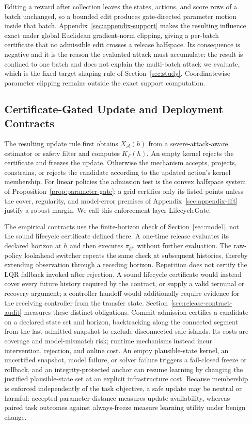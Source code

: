Editing a reward after collection leaves the states, actions, and score rows
of a batch unchanged, so a bounded edit produces gate-directed parameter
motion inside that batch.  Appendix~\ref{sec:appendix-support} makes the
resulting influence exact under global Euclidean gradient-norm clipping,
giving a per-batch certificate that no admissible edit crosses a release
halfspace.  Its consequence is negative and it is the reason the evaluated
attack must accumulate: the result is confined to one batch and does not
explain the multi-batch attack we evaluate, which is the fixed target-shaping
rule of Section~\ref{sec:study}.  Coordinatewise parameter clipping remains
outside the exact support computation.

\subsection{Certificate-Gated Update and Deployment Contracts}
\label{sec:lifecyclegate}

The resulting update rule first obtains $X_{\mathcal A}(h)$ from a
severe-attack-aware estimator or safety filter and computes $K_\Gamma(h)$.  An
empty kernel rejects the certificate and freezes the update.  Otherwise the
mechanism accepts, projects, constrains, or rejects the candidate according to
the updated action's kernel membership.  For linear policies the admission
test is the convex halfspace system of
Proposition~\ref{prop:parameter-gate}; a grid certifies only its listed points
unless the cover, regularity, and model-error premises of
Appendix~\ref{sec:appendix-lift} justify a robust margin.  We call this
enforcement layer LifecycleGate.

The empirical contracts use the finite-horizon check of
Section~\ref{sec:model}, not the sound lifecycle certificate defined there.  A
one-time release evaluates its declared horizon at $h$ and then executes
$\pi_{\theta^+}$ without further evaluation.  The raw-policy lookahead
switcher repeats the same check at subsequent histories, thereby extending
observation through a receding horizon.  Repetition does not certify the LQR
fallback invoked after rejection.  A sound lifecycle certificate would instead cover every
future history required by the contract, or supply a valid terminal or
recovery argument; a controller handoff would additionally require evidence
for the receiving controller from the transfer state.
Section~\ref{sec:release-contract-audit} measures these distinct obligations.
Commit admission certifies a candidate on a declared state set and horizon,
backtracking along the connected segment from the last admitted snapshot to
exclude disconnected safe islands.  Its costs are coverage and model-mismatch
risk; runtime mechanisms instead incur intervention, rejection, and online
cost.  An empty plausible-state kernel, an uncertified snapshot,
model failure, or solver failure triggers a fail-closed freeze or rollback,
and an integrity-protected anchor can resume learning by changing the justified
plausible-state set at an explicit infrastructure cost.  Because membership is
enforced independently of the task objective, a safe update may be neutral or
harmful: accepted parameter distance measures update availability, whereas
paired task outcomes against always-freeze measure learning utility under
benign change.
